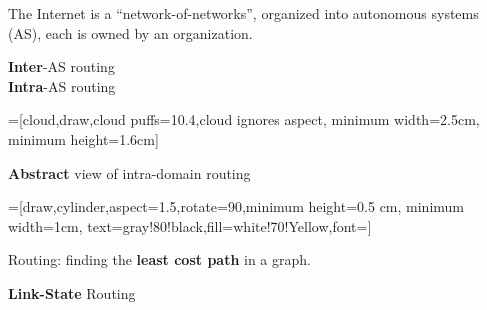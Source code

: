 \begin{cf}
The Internet is a ``network-of-networks'', organized into autonomous systems (AS), each is owned by an organization.
\end{cf}

\begin{cf}{
\textbf{Inter}-AS routing\\
\textbf{Intra}-AS routing
}
\end{cf}

=[cloud,draw,cloud puffs=10.4,cloud ignores aspect, minimum width=2.5cm, minimum height=1.6cm]
\begin{cf}{
}
\end{cf}

\begin{cf}{
	\textbf{Abstract} view of intra-domain routing
}
\end{cf}

=[draw,cylinder,aspect=1.5,rotate=90,minimum height=0.5 cm, minimum width=1cm, text=gray!80!black,fill=white!70!Yellow,font=\small]

\begin{cf}{\normalsize
}
\end{cf}

\begin{cf}{
	Routing: finding the \textbf{least cost path} in a graph.
}
\end{cf}

\begin{cf}{
	\textbf{Link-State} Routing
}
\end{cf}

